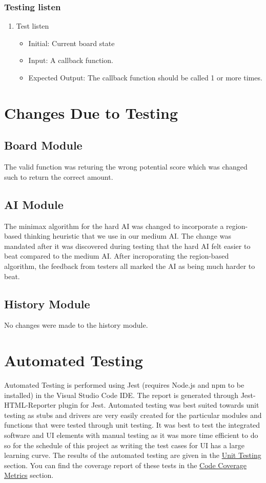 \documentclass[12pt, titlepage]{article}
\begin{document}
\subsubsection{Testing listen}
\begin{enumerate}
	\item Test listen \begin{itemize}
		      \item Initial: Current board state
		      \item Input: A callback function.
		      \item Expected Output: The callback function should be called 1 or more times.
	      \end{itemize}
\end{enumerate}

\section{Changes Due to Testing}

\subsection{Board Module}
The valid function was returing the wrong potential score which was changed such to return the correct amount. 

\subsection{AI Module}
The minimax algorithm for the hard AI was changed to incorporate a region-based thinking heuristic that we use in our medium AI. The change was mandated after it was discovered during testing that the hard AI felt easier to beat compared to the medium AI. After incroporating the region-based algorithm, the feedback from testers all marked the AI as being much harder to beat. 

\subsection{History Module}
No changes were made to the history module.

\section{Automated Testing}
\hypertarget{sec:ccm}{}

Automated Testing is performed using Jest (requires Node.js and npm to be installed) in the Visual Studio Code IDE. The report is generated through Jest-HTML-Reporter plugin for Jest. Automated testing was best suited towards unit testing as stubs and drivers are very easily created for the particular modules and functions that were tested through unit testing. It was best to test the integrated software and UI elements with manual testing as it was more time efficient to do so for the schedule of this project as writing the test cases for UI has a large learning curve. The results of the automated testing are given in the \hyperref[sec:ut]{Unit Testing} section. You can find the coverage report of these tests in the \hyperref[sec:ccm]{Code Coverage Metrics} section.
\end{document}
